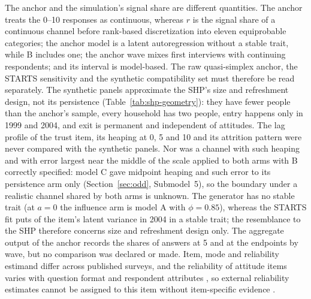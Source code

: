 The anchor and the simulation's signal share are different quantities. The anchor treats the 0--10 responses as continuous, whereas $r$ is the signal share of a continuous channel before rank-based discretization into eleven equiprobable categories; the anchor model is a latent autoregression without a stable trait, while B includes one; the anchor wave mixes first interviews with continuing respondents; and its interval is model-based. The raw quasi-simplex anchor, the STARTS sensitivity and the synthetic compatibility set must therefore be read separately. %
The synthetic panels approximate the SHP's size and refreshment design, not its persistence (Table~\ref{tab:shp-geometry}): they have fewer people than the anchor's sample, every household has two people, entry happens only in 1999 and 2004, and exit is permanent and independent of attitudes. The lag profile of the trust item, its heaping at 0, 5 and 10 and its attrition pattern were never compared with the synthetic panels. Nor was a channel with such heaping and with error largest near the middle of the scale applied to both arms with B correctly specified: model C gave midpoint heaping and such error to its persistence arm only (Section~\ref{sec:odd}, Submodel~5), so the boundary under a realistic channel shared by both arms is unknown. The generator has no stable trait (at $a=0$ the influence arm is model A with $\phi=0.85$), whereas the STARTS fit puts  of the item's latent variance in 2004 in a stable trait; the resemblance to the SHP therefore concerns size and refreshment design only. The aggregate output of the anchor records the shares of answers at 5 and at the endpoints by wave, but no comparison was declared or made. Item, mode and reliability estimand differ across published surveys, and the reliability of attitude items varies with question format and respondent attributes \cite{alwinkrosnick1991reliability}, so external reliability estimates cannot be assigned to this item without item-specific evidence \cite{antoun2026,lucasdonnellan2012}.
